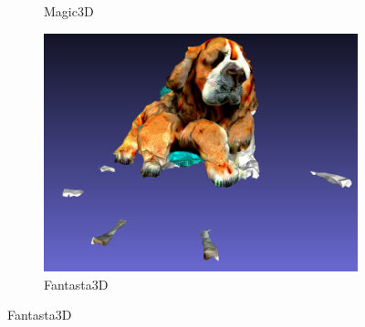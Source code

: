 \begin{figure}[ht]
\begin{subfigure}[b]{0.32\textwidth}
        \caption{Magic3D}
        \vspace{0.1cm}
    \end{subfigure}
    \begin{subfigure}[b]{0.33\textwidth}
        \centering
        \includegraphics[width=\textwidth]{etc/a high-quality rendering of a big dog sleeping on a chair/fantasia3d/fantasia_dog_front_result.png}
        \caption{Fantasta3D}
        \vspace{0.1cm}
    \end{subfigure}


\end{figure}
